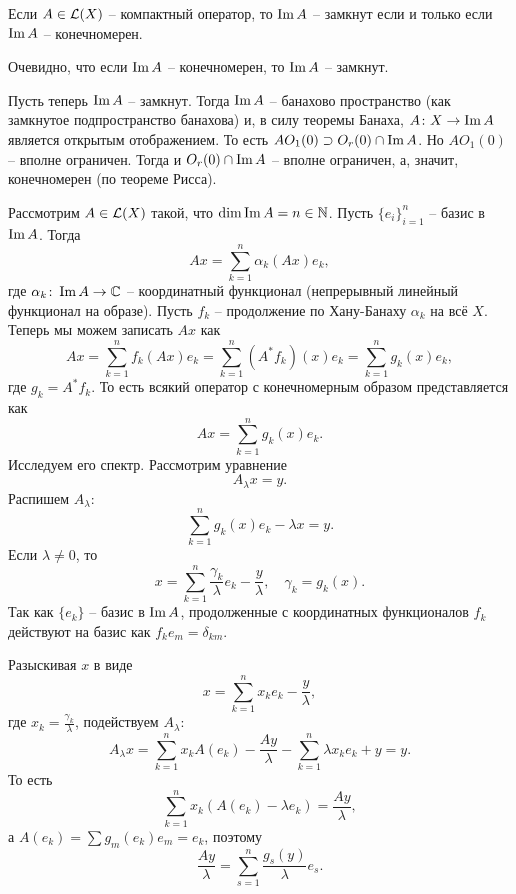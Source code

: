 \begin{note}
    Если $A \in \mathcal{L}(X)$ -- компактный оператор, то $\operatorname{Im} A$ -- замкнут если и только если $\operatorname{Im} A$ -- конечномерен.

    Очевидно, что если $\operatorname{Im} A$ -- конечномерен, то $\operatorname{Im} A$ -- замкнут.

    Пусть теперь $\operatorname{Im} A$ -- замкнут. Тогда $\operatorname{Im} A$ -- банахово пространство (как замкнутое подпространство банахова) и, в силу теоремы Банаха, $A\colon X \to \operatorname{Im} A$ является открытым отображением. То есть $AO_1(0) \supset O_r(0) \cap \operatorname{Im} A$.
    Но $AO_1(0)$ -- вполне ограничен.
    Тогда и $O_r(0) \cap \operatorname{Im} A$ -- вполне ограничен, а, значит, конечномерен (по теореме Рисса).
\end{note}
\begin{note}
    Рассмотрим $A \in \mathcal{L}(X)$ такой, что $\dim \operatorname{Im} A = n \in \mathbb{N}$.
    Пусть $\{e_i\}_{i = 1}^{n}$ -- базис в $\operatorname{Im} A$.
    Тогда
    \[
        Ax = \sum_{k = 1}^{n} \alpha_k (A x)e_k,
    \]
    где $\alpha_k\colon \operatorname{Im} A \to \mathbb{C}$ -- координатный функционал (непрерывный линейный функционал на образе).
    Пусть $f_k$ -- продолжение по Хану-Банаху $\alpha_k$ на всё $X$.
    Теперь мы можем записать $Ax$ как
    \[
        Ax = \sum_{k = 1}^{n} f_k(Ax)e_k = \sum_{k = 1}^{n} (A^* f_k)(x)e_k = \sum_{k = 1}^{n} g_k(x)e_k,
    \]
    где $g_k = A^* f_k$.
    То есть всякий оператор с конечномерным образом представляется как
    \[
        Ax = \sum_{k = 1}^{n} g_k(x)e_k.
    \]
    Исследуем его спектр.
    Рассмотрим уравнение
    \[
        A_\lambda x = y.
    \]
    Распишем $A_\lambda:$
    \[
        \sum_{k = 1}^{n} g_k(x)e_k - \lambda x = y.
    \]
    Если $\lambda \neq 0$, то 
    \[
        x = \sum_{k = 1}^{n} \frac{\gamma_k}{\lambda}e_k - \frac{y}{\lambda},  \quad \gamma_k = g_k(x).
    \]
    Так как $\{e_k\}$ -- базис в $\operatorname{Im} A$, продолженные с координатных функционалов $f_k$ действуют на базис как $f_ke_m = \delta_{km}$.

    Разыскивая $x$ в виде
    \[
        x = \sum_{k = 1}^{n} x_k e_k - \frac{y}{\lambda},
    \]
    где $x_k = \frac{\gamma_k}{\lambda}$, подействуем $A_\lambda\colon$
    \[
        A_\lambda x = \sum_{k = 1}^{n} x_k A(e_k) - \frac{Ay}{\lambda} - \sum_{k = 1}^{n} \lambda x_k e_k + y = y.
    \]
    То есть
    \[
            \sum_{k = 1}^{n} x_k(A(e_k) - \lambda e_k) = \frac{Ay}{\lambda},
    \]
    а $A(e_k) = \sum g_m(e_k)e_m = e_k$, поэтому
    \[
        \frac{Ay}{\lambda} = \sum_{s = 1}^n \frac{g_s(y)}{\lambda}e_s.
    \]
\end{note}


